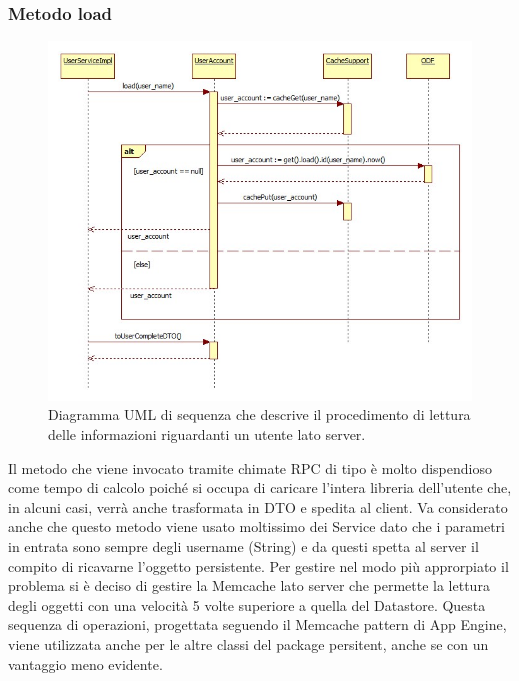 \subsubsection*{Metodo load}
\begin{figure}[!h]
  \centering
  \includegraphics[width=17cm]{img/DP/load_user.jpg}
\caption{Diagramma UML di sequenza che descrive il procedimento di lettura
delle informazioni riguardanti un utente lato server.}
\end{figure}
Il metodo  che viene invocato tramite chimate RPC di tipo
 \`e molto dispendioso come tempo di calcolo poich\'e si occupa
di caricare l'intera libreria dell'utente che, in alcuni casi, verr\`a
anche trasformata in DTO e spedita al client. Va considerato anche che questo
metodo viene usato moltissimo dei Service dato che i parametri in entrata sono
sempre degli username (String) e da questi spetta al server il compito di
ricavarne l'oggetto persistente. Per gestire nel modo pi\`u approrpiato il
problema si \`e deciso di gestire la Memcache lato server che permette la
lettura degli oggetti con una velocit\`a 5 volte superiore a quella del
Datastore. Questa sequenza di operazioni, progettata seguendo il Memcache
pattern di App Engine, viene utilizzata anche per le altre classi del package
persitent, anche se con un vantaggio meno evidente.
